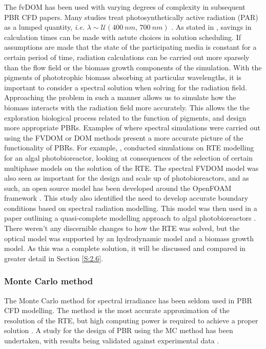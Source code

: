 The fvDOM has been used with varying degrees of complexity in subsequent PBR CFD papers. Many studies treat photosynthetically active radiation (PAR) as a lumped quantity, \textit{i.e.} $\lambda \sim \mathcal{U}(400\ nm ,\, 700\ nm)$
\cite{Soman2015,Pandey2015,Wheaton2012,Huang2011,Eltayeb2010}. 
\skippingparagraph
As stated in \cite{Krishnamoorthy2014}, savings in calculation times can be made with astute choices in solution scheduling. If assumptions are made that the state of the participating media is constant for a certain period of time, radiation calculations can be carried out more sparsely than the flow field or the biomass growth components of the simulation. With the pigments of phototrophic biomass absorbing at particular wavelengths, it is important to consider a spectral solution when solving for the radiation field. Approaching the problem in such a manner allows us to simulate how the biomass interacts with the radiation field more accurately. This allows the the exploration biological process related to the function of pigments, and design more appropriate PBRs. Examples of where spectral simulations were carried out using the FVDOM or DOM methods present a more accurate picture of the functionality of PBRs. For example, \cite{Krishnamoorthy2014},  conducted simulations on RTE modelling for an algal photobioreactor, looking at consequences of the selection of certain multiphase models on the solution of the RTE. The spectral FVDOM model was also seen as important for the design and scale up of photobioreactors, and as such, an open source model has been developed around the OpenFOAM framework \cite{Kong2014}. This study also identified the need to develop accurate boundary conditions based on spectral radiation modelling. This model was then used in a paper outlining a quasi-complete modelling approach to algal photobioreactors \cite{Gao2016}. There weren't any discernible changes to how the RTE was solved, but the optical model was supported by an hydrodynamic model and a biomass growth model. As this was a complete solution, it will be discussed and compared in greater detail in Section \ref{S:2.6}. 
\skippingparagraph

\subsubsection{Monte Carlo method}
The Monte Carlo method for spectral irradiance has been seldom used in PBR CFD modelling. The method is the most accurate approximation of the resolution of the RTE, but high computing power is required to achieve a proper solution \cite{Kong2014}. A study for the design of PBR using the MC method has been undertaken, with results being validated against experimental data \cite{Heinrich2012}.

